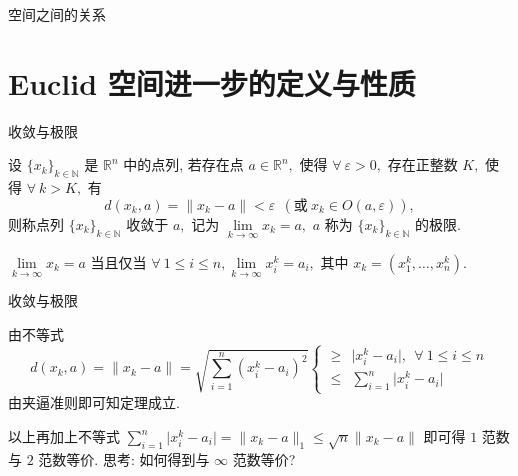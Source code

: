 
\begin{frame}{空间之间的关系}

\begin{center}

\end{center}

\end{frame}


\section[更多概念与性质]{Euclid 空间进一步的定义与性质}


\begin{frame}{收敛与极限}

\begin{Def}
设 $\{x_k\}_{k\in\mathbb{N}}$ 是 $\mathbb{R}^n$ 中的点列, 若存在点 $a \in \mathbb{R}^n,$ 使得 $\forall~\varepsilon > 0,$ 存在正整数 $K,$ 使得 $\forall~k > K,$ 有
\[d(x_k, a) = \lVert x_k - a \rVert < \varepsilon ~~ (\text{或}~ x_k \in O(a, \varepsilon)),\]
则称点列 $\{x_k\}_{k\in\mathbb{N}}$ 收敛于 $a,$ 记为 $\lim\limits_{k\to\infty} x_k = a,$ $a$ 称为 $\{x_k\}_{k\in\mathbb{N}}$ 的极限.
\end{Def}

\pause

\begin{thm}
$\lim\limits_{k\to\infty} x_k = a$ 当且仅当 $\forall~1 \leqslant i \leqslant n, \lim\limits_{k\to\infty} x_i^k = a_i,$ 其中 $x_k = (x_1^k, \dots, x_n^k).$
\end{thm}

\end{frame}


\begin{frame}{收敛与极限}

由不等式
\[d(x_k, a) = \lVert x_k - a \rVert = \sqrt{\sum\limits_{i=1}^n (x_i^k - a_i)^2} \begin{cases}
\geqslant ~~ \lvert x_i^k - a_i \rvert, ~~ \forall~1 \leqslant i \leqslant n \\
\leqslant ~~ \sum\limits_{i=1}^n \lvert x_i^k - a_i \rvert
\end{cases}\]
由夹逼准则即可知定理成立.

\pause
\vspace{1em}

以上再加上不等式 $\sum\limits_{i=1}^n \lvert x_i^k - a_i \rvert = \lVert x_k - a \rVert_1 \leqslant \sqrt{n} \lVert x_k - a \rVert$ 即可得 $1$ 范数与 $2$ 范数等价.
\pause
{\color{red}思考}: 如何得到与 $\infty$ 范数等价?

\end{frame}

